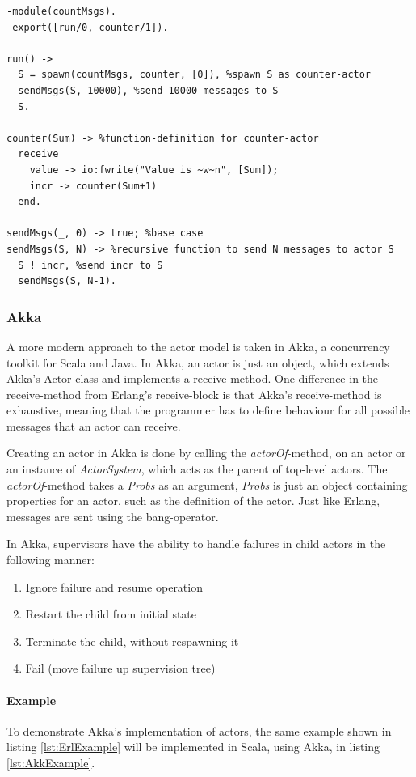 \begin{lstlisting}[style=erlang, caption={A simple message-counter in Erlang.}, label=lst:ErlExample]
-module(countMsgs).
-export([run/0, counter/1]).

run() ->
  S = spawn(countMsgs, counter, [0]), %spawn S as counter-actor
  sendMsgs(S, 10000), %send 10000 messages to S
  S.
  
counter(Sum) -> %function-definition for counter-actor
  receive
    value -> io:fwrite("Value is ~w~n", [Sum]);
    incr -> counter(Sum+1)
  end.

sendMsgs(_, 0) -> true; %base case
sendMsgs(S, N) -> %recursive function to send N messages to actor S
  S ! incr, %send incr to S
  sendMsgs(S, N-1).
\end{lstlisting}

\subsubsection{Akka}
A more modern approach to the actor model is taken in Akka, a concurrency toolkit for Scala and Java.
In Akka, an actor is just an object, which extends Akka's Actor-class and implements a receive method. One difference in the receive-method from Erlang's receive-block is that Akka's receive-method is exhaustive, meaning that the programmer has to define behaviour for all possible messages that an actor can receive. 

Creating an actor in Akka is done by calling the \emph{actorOf}-method, on an actor or an instance of \emph{ActorSystem}, which acts as the parent of top-level actors. The \emph{actorOf}-method takes a \emph{Probs} as an argument, \emph{Probs} is just an object containing properties for an actor, such as the definition of the actor. Just like Erlang, messages are sent using the bang-operator.

In Akka, supervisors have the ability to handle failures in child actors in the following manner:
\begin{enumerate}
  \item Ignore failure and resume operation
  \item Restart the child from initial state
  \item Terminate the child, without respawning it
  \item Fail (move failure up supervision tree)
\end{enumerate}

\paragraph{Example}
To demonstrate Akka's implementation of actors, the same example shown in listing \ref{lst:ErlExample} will be implemented in Scala, using Akka, in listing \ref{lst:AkkExample}.

